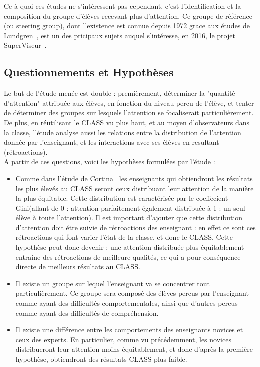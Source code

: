 \documentclass{article}
\begin{document}
Ce à quoi ces études ne s'intéressent pas cependant, c'est l'identification et la composition du groupe d'élèves recevant plus d'attention. Ce groupe de référence (ou steering group), dont l'existence est connue depuis 1972 grace aux études de Lundgren~\cite{Lundgren}, est un des pricipaux sujets auquel s'intéresse, en 2016, le projet SuperViseur~\cite{SuperViseur}.

\subsection{Questionnements et Hypothèses}
Le but de l'étude menée est double : premièrement, déterminer la "quantité d'attention" attribuée aux élèves, en fonction du niveau percu de l'élève, et tenter de déterminer des groupes sur lesquels l'attention se focaliserait particulièrement. De plus, en réutilisant le CLASS vu plus haut, et au moyen d'observateurs dans la classe, l'étude analyse aussi les relations entre la distribution de l'attention donnée par l'enseignant, et les interactions avec ses élèves en resultant (rétroactions).\\
A partir de ces questions, voici les hypothèses formulées par l'étude :
\begin{itemize}
    \item Comme dans l'étude de Cortina~\cite{Cortina} les enseignants qui obtiendront les résultats les plus élevés au CLASS seront ceux distribuant leur attention de la manière la plus équitable. Cette distribution est caractérisée par le coeffecient Gini(allant de 0 : attention parfaitement également distribuée à 1 : un seul élève à toute l'attention). Il est important d'ajouter que cette distribution d'attention doit étre suivie de rétroactions des enseignant : en effet ce sont ces rétroactions qui font varier l'état de la classe, et donc le CLASS. Cette hypothèse peut donc devenir : une attention distribuée plus équitablement entraine des rétroactions de meilleure qualités, ce qui a pour conséquence directe de meilleurs résultats au CLASS.
  \item Il existe un groupe sur lequel l'enseignant va se concentrer tout particulièrement. Ce groupe sera composé des élèves percus par l'enseignant comme ayant des difficultés comportementales, ainsi que d'autres percus comme ayant des difficultés de compréhension.
  \item Il existe une différence entre les comportements des enseignants novices et ceux des experts. En particulier, comme vu précédemment, les novices distribueront leur attention moins équitablement, et donc d'après la première hypothèse, obtiendront des résultats CLASS plus faible.
\end{itemize}
\end{document}
